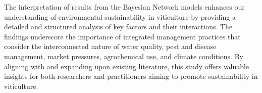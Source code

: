 The interpretation of results from the Bayesian Network models enhances our understanding of environmental sustainability in viticulture by providing a detailed and structured analysis of key factors and their interactions. The findings underscore the importance of integrated management practices that consider the interconnected nature of water quality, pest and disease management, market pressures, agrochemical use, and climate conditions. By aligning with and expanding upon existing literature, this study offers valuable insights for both researchers and practitioners aiming to promote sustainability in viticulture.
